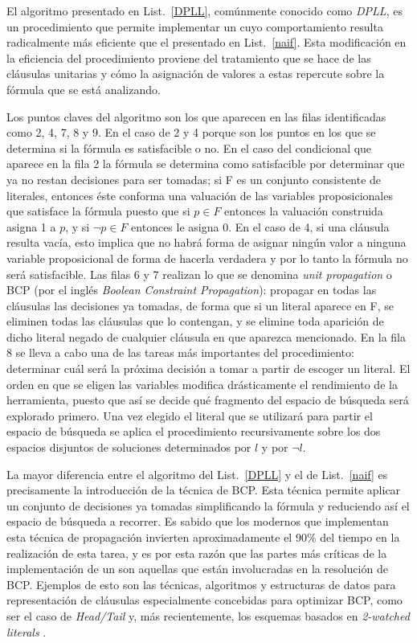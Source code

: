 El algoritmo presentado en List.~\ref{DPLL}, comúnmente conocido como \emph{DPLL}, es un procedimiento que permite implementar un \ssolver cuyo comportamiento resulta radicalmente más eficiente que el presentado en List.~\ref{naif}. Esta modificación en la eficiencia del procedimiento proviene del tratamiento que se hace de las cláusulas unitarias y cómo la asignación de valores a estas repercute sobre la fórmula que se está analizando. 

Los puntos claves del algoritmo son los que aparecen en las filas identificadas como 2, 4, 7, 8 y 9. En el caso de 2 y 4 porque son los puntos en los que se determina si la fórmula es satisfacible o no. En el caso del condicional que aparece en la fila 2 la fórmula se determina como satisfacible por determinar que ya no restan decisiones para ser tomadas; si F es un conjunto consistente de literales, entonces éste conforma una valuación de las variables proposicionales que satisface la fórmula puesto que si $p \in F$ entonces la valuación construida asigna 1 a $p$, y si $\neg p \in F$ entonces le asigna 0. En el caso de 4, si una cláusula resulta vacía, esto implica que no habrá forma de asignar ningún valor a ninguna variable proposicional de forma de hacerla verdadera y por lo tanto la fórmula no será satisfacible. Las filas 6 y 7 realizan lo que se denomina \emph{unit propagation} o BCP (por el inglés \emph{Boolean Constraint Propagation}): propagar en todas las cláusulas las decisiones ya tomadas, de forma que si un literal aparece en F, se eliminen todas las cláusulas que lo contengan, y se elimine toda aparición de dicho literal negado de cualquier cláusula en que aparezca mencionado. En la fila 8 se lleva a cabo una de las tareas más importantes del procedimiento: determinar cuál será la próxima decisión a tomar a partir de escoger un literal. El orden en que se eligen las variables modifica drásticamente el rendimiento de la herramienta, puesto que así se decide qué fragmento del espacio de búsqueda será explorado primero. Una vez elegido el literal que se utilizará para partir el espacio de búsqueda se aplica el procedimiento recursivamente sobre los dos espacios disjuntos de soluciones determinados por $l$ y por $\neg l$.

La mayor diferencia entre el algoritmo del List.~\ref{DPLL} y el de List.~\ref{naif} es precisamente la introducción de la técnica de BCP. Esta técnica permite aplicar un conjunto de decisiones ya tomadas simplificando la fórmula y reduciendo así el espacio de búsqueda a recorrer. Es sabido \cite{moskewicz:da01} que los \ssolver modernos que implementan esta técnica de propagación invierten aproximadamente el 90\% del tiempo en la realización de esta tarea, y es por esta razón que las partes más críticas de la implementación de un \ssolver son aquellas que están involucradas en la resolución de BCP. Ejemplos de esto son las técnicas, algoritmos y estructuras de datos para representación de cláusulas especialmente concebidas para optimizar BCP, como ser el caso de \emph{Head/Tail} \cite{zhang+:cade97} y, más recientemente, los esquemas basados en \emph{2-watched literals} \cite{moskewicz:da01}. %


